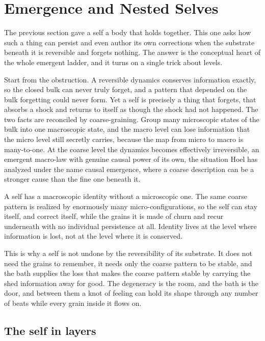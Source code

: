 \section{Emergence and Nested Selves}

The previous section gave a self a body that holds together. This one asks how such a thing can persist and even author its own corrections when the substrate beneath it is reversible and forgets nothing. The answer is the conceptual heart of the whole emergent ladder, and it turns on a single trick about levels.

Start from the obstruction. A reversible dynamics conserves information exactly, so the closed bulk can never truly forget, and a pattern that depended on the bulk forgetting could never form. Yet a self is precisely a thing that forgets, that absorbs a shock and returns to itself as though the shock had not happened. The two facts are reconciled by coarse-graining. Group many microscopic states of the bulk into one macroscopic state, and the macro level can lose information that the micro level still secretly carries, because the map from micro to macro is many-to-one. At the coarse level the dynamics becomes effectively irreversible, an emergent macro-law with genuine causal power of its own, the situation Hoel has analyzed under the name causal emergence, where a coarse description can be a stronger cause than the fine one beneath it.

\begin{principle}
A self has a macroscopic identity without a microscopic one. The same coarse pattern is realized by enormously many micro-configurations, so the self can stay itself, and correct itself, while the grains it is made of churn and recur underneath with no individual persistence at all. Identity lives at the level where information is lost, not at the level where it is conserved.
\end{principle}

This is why a self is not undone by the reversibility of its substrate. It does not need the grains to remember, it needs only the coarse pattern to be stable, and the bath supplies the loss that makes the coarse pattern stable by carrying the shed information away for good. The degeneracy is the room, and the bath is the door, and between them a knot of feeling can hold its shape through any number of beats while every grain inside it flows on.

\subsection{The self in layers}

